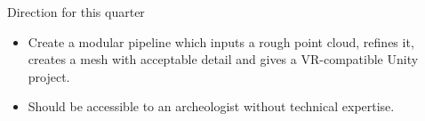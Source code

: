 





\begin{frame}{Direction for this quarter}
    \begin{itemize}
        \item Create a modular pipeline which inputs a rough point cloud, refines it, creates a mesh with acceptable detail and gives a VR-compatible Unity project.
        \item Should be accessible to an archeologist without technical expertise.
    \end{itemize}    
\end{frame}

